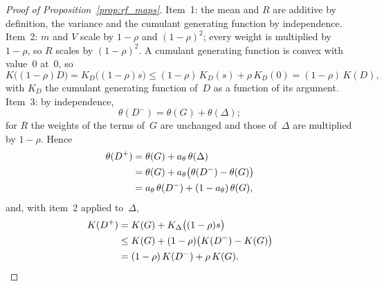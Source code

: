 \documentclass[11pt,a4paper]{article}
\theoremstyle{plain}
\theoremstyle{definition}
\theoremstyle{remark}
\begin{document}
\label{prf:prop:rf_maps}
\begin{proof}[Proof of Proposition~\ref{prop:rf_maps}]
Item~1: the mean and $R$ are additive by definition, the variance and the cumulant generating function by independence.
Item~2: $m$ and $V$ scale by $1-\rho$ and $(1-\rho)^2$; every weight is multiplied by $1-\rho$, so $R$ scales by $(1-\rho)^2$.
A cumulant generating function is convex with value~$0$ at~$0$, so
\begin{equation}
  K\bigl((1-\rho)D\bigr) = K_D\bigl((1-\rho)s\bigr) \le (1-\rho)\,K_D(s) + \rho\,K_D(0) = (1-\rho)\,K(D),
\end{equation}
with $K_D$ the cumulant generating function of~$D$ as a function of its argument.
Item~3: by independence,
\begin{equation}
  \theta(D^-) = \theta(G) + \theta(\Delta);
\end{equation}
for $R$ the weights of the terms of~$G$ are unchanged and those of~$\Delta$ are multiplied by $1-\rho$.
Hence
\begin{align}
  \theta(D^+) &= \theta(G) + a_\theta\,\theta(\Delta) \notag\\
  &= \theta(G) + a_\theta\bigl(\theta(D^-) - \theta(G)\bigr) \notag\\
  &= a_\theta\,\theta(D^-) + (1 - a_\theta)\,\theta(G),
\end{align}
and, with item~2 applied to~$\Delta$,
\begin{align}
  K(D^+) &= K(G) + K_\Delta\bigl((1-\rho)s\bigr) \notag\\
  &\le K(G) + (1-\rho)\bigl(K(D^-) - K(G)\bigr) \notag\\
  &= (1-\rho)\,K(D^-) + \rho\,K(G).
\end{align}
\end{proof}
\end{document}
